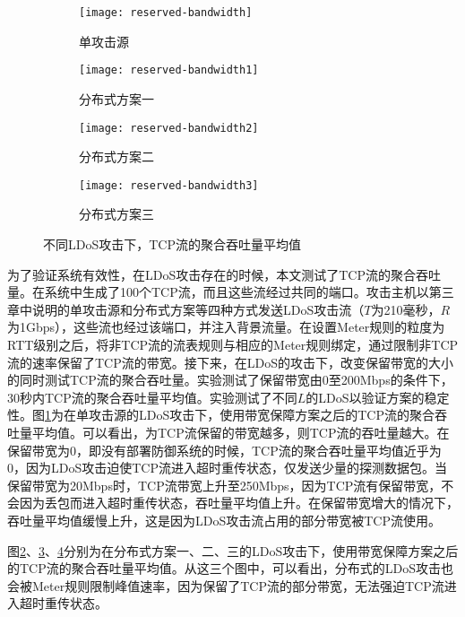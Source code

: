\begin{figure}
    \begin{subfigure}{.49\textwidth}
        \centering
        \texttt{[image: reserved-bandwidth]}
        \caption{单攻击源}
        \label{fig:reserved-bandwidth-single}
    \end{subfigure}
    \begin{subfigure}{.49\textwidth}
        \centering
        \texttt{[image: reserved-bandwidth1]}
        \caption{分布式方案一}
        \label{fig:reserved-bandwidth-2h-mod1}
    \end{subfigure}

    \begin{subfigure}{.49\textwidth}
        \centering
        \texttt{[image: reserved-bandwidth2]}
        \caption{分布式方案二}
        \label{fig:reserved-bandwidth-2h-mod2}
    \end{subfigure}
    \begin{subfigure}{.49\textwidth}
        \centering
        \texttt{[image: reserved-bandwidth3]}
        \caption{分布式方案三}
        \label{fig:reserved-bandwidth-2h-mod3}
    \end{subfigure}


    \caption{不同LDoS攻击下，TCP流的聚合吞吐量平均值}
    \label{fig:reserved-bandwidth-all}
\end{figure}
为了验证系统有效性，在LDoS攻击存在的时候，本文测试了TCP流的聚合吞吐量。在系统中生成了100个TCP流，而且这些流经过共同的端口。攻击主机以第三章中说明的单攻击源和分布式方案等四种方式发送LDoS攻击流（$T$为210毫秒，$R$为1Gbps），这些流也经过该端口，并注入背景流量。在设置Meter规则的粒度为RTT级别之后，将非TCP流的流表规则与相应的Meter规则绑定，通过限制非TCP流的速率保留了TCP流的带宽。接下来，在LDoS的攻击下，改变保留带宽的大小的同时测试TCP流的聚合吞吐量。实验测试了保留带宽由0至200Mbps的条件下，30秒内TCP流的聚合吞吐量平均值。实验测试了不同$L$的LDoS以验证方案的稳定性。图\ref{fig:reserved-bandwidth-single}为在单攻击源的LDoS攻击下，使用带宽保障方案之后的TCP流的聚合吞吐量平均值。可以看出，为TCP流保留的带宽越多，则TCP流的吞吐量越大。在保留带宽为0，即没有部署防御系统的时候，TCP流的聚合吞吐量平均值近乎为0，因为LDoS攻击迫使TCP流进入超时重传状态，仅发送少量的探测数据包。当保留带宽为20Mbps时，TCP流带宽上升至250Mbps，因为TCP流有保留带宽，不会因为丢包而进入超时重传状态，吞吐量平均值上升。在保留带宽增大的情况下，吞吐量平均值缓慢上升，这是因为LDoS攻击流占用的部分带宽被TCP流使用。

图\ref{fig:reserved-bandwidth-2h-mod1}、\ref{fig:reserved-bandwidth-2h-mod2}、\ref{fig:reserved-bandwidth-2h-mod3}分别为在分布式方案一、二、三的LDoS攻击下，使用带宽保障方案之后的TCP流的聚合吞吐量平均值。从这三个图中，可以看出，分布式的LDoS攻击也会被Meter规则限制峰值速率，因为保留了TCP流的部分带宽，无法强迫TCP流进入超时重传状态。



